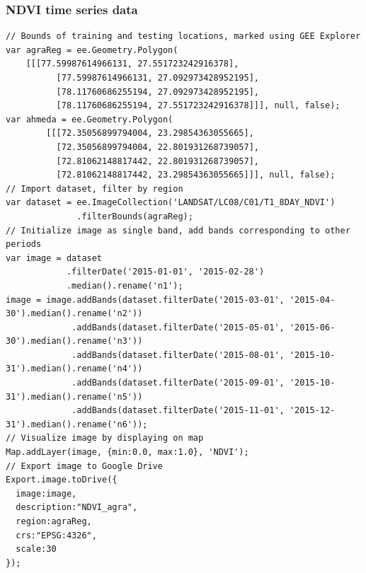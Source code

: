 \documentclass[12pt, a4paper]{report}
\begin{document}
\subsubsection*{NDVI time series data}
\begin{verbatim}
// Bounds of training and testing locations, marked using GEE Explorer
var agraReg = ee.Geometry.Polygon(
	[[[77.59987614966131, 27.551723242916378],
          [77.59987614966131, 27.092973428952195],
          [78.11760686255194, 27.092973428952195],
          [78.11760686255194, 27.551723242916378]]], null, false);
var ahmeda = ee.Geometry.Polygon(
        [[[72.35056899794004, 23.29854363055665],
          [72.35056899794004, 22.801931268739057],
          [72.81062148817442, 22.801931268739057],
          [72.81062148817442, 23.29854363055665]]], null, false);
// Import dataset, filter by region
var dataset = ee.ImageCollection('LANDSAT/LC08/C01/T1_8DAY_NDVI')
              .filterBounds(agraReg);
// Initialize image as single band, add bands corresponding to other periods
var image = dataset
            .filterDate('2015-01-01', '2015-02-28')
            .median().rename('n1');
image = image.addBands(dataset.filterDate('2015-03-01', '2015-04-30').median().rename('n2'))
             .addBands(dataset.filterDate('2015-05-01', '2015-06-30').median().rename('n3'))
             .addBands(dataset.filterDate('2015-08-01', '2015-10-31').median().rename('n4'))
             .addBands(dataset.filterDate('2015-09-01', '2015-10-31').median().rename('n5'))
             .addBands(dataset.filterDate('2015-11-01', '2015-12-31').median().rename('n6'));
// Visualize image by displaying on map
Map.addLayer(image, {min:0.0, max:1.0}, 'NDVI');
// Export image to Google Drive
Export.image.toDrive({
  image:image,
  description:"NDVI_agra",
  region:agraReg,
  crs:"EPSG:4326",
  scale:30
});
\end{verbatim}
\end{document}
